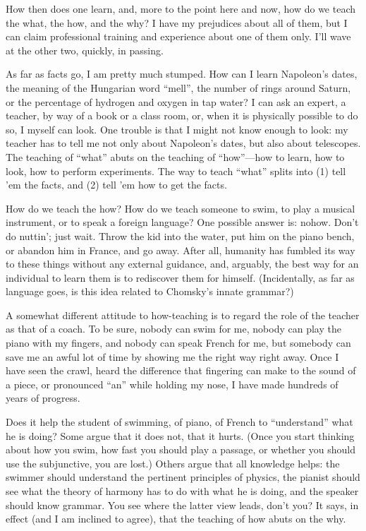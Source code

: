 \documentclass[a4paper,12pt]{article}
\begin{document}
How then does one learn, and, more to the point here and now, how do we
teach the what, the how, and the why?  I have my prejudices about all of
them, but I can claim professional training and experience about one of
them only.  I’ll wave at the other two, quickly, in passing.

As far as facts go, I am pretty much stumped.  How can I learn Napoleon’s
dates, the meaning of the Hungarian word “mell”, the number of rings
around Saturn, or the percentage of hydrogen and oxygen in tap water?  I
can ask an expert, a teacher, by way of a book or a class room, or, when
it is physically possible to do so, I myself can look.  One trouble is
that I might not know enough to look: my teacher has to tell me not only
about Napoleon’s dates, but also about telescopes.  The teaching of “what”
abuts on the teaching of “how”—how to learn, how to look, how to perform
experiments.  The way to teach “what” splits into (1) tell ’em the facts,
and (2) tell ’em how to get the facts.

How do we teach the how?  How do we teach someone to swim, to play a
musical instrument, or to speak a foreign language?  One possible answer
is: nohow.  Don’t do nuttin’; just wait.  Throw the kid into the water,
put him on the piano bench, or abandon him in France, and go away.  After
all, humanity has fumbled its way to these things without any external
guidance, and, arguably, the best way for an individual to learn them is
to rediscover them for himself.  (Incidentally, as far as language goes,
is this idea related to Chomsky’s innate grammar?)

A somewhat different attitude to how-teaching is to regard the role of the
teacher as that of a coach.  To be sure, nobody can swim for me, nobody can
play the piano with my fingers, and nobody can speak French for me, but
somebody can save me an awful lot of time by showing me the right way right
away.  Once I have seen the crawl, heard the difference that fingering can
make to the sound of a piece, or pronounced “an” while holding my nose, I
have made hundreds of years of progress.

Does it help the student of swimming, of piano, of French to “understand”
what he is doing?  Some argue that it does not, that it hurts.  (Once you
start thinking about how you swim, how fast you should play a passage, or
whether you should use the subjunctive, you are lost.)  Others argue that
all knowledge helps: the swimmer should understand the pertinent principles
of physics, the pianist should see what the theory of harmony has to do
with what he is doing, and the speaker should know grammar.  You see where
the latter view leads, don’t you?  It says, in effect (and I am inclined to
agree), that the teaching of how abuts on the why.
\end{document}
